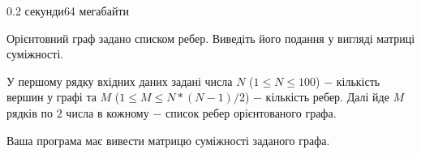 \begin{problem}{}{}{}{0.2 секунди}{64 мегабайти}

Орієнтовний граф задано списком ребер. Виведіть його подання у вигляді матриці суміжності.

\InputFile
У першому рядку вхідних даних задані числа $N$ ($1 \le N \le 100$) $-$ кількість вершин у графі та 
$M$ ($1 \le M \le N*(N-1)/2$) $-$ кількість ребер.
Далі йде $M$ рядків по $2$ числа в кожному $-$ список ребер орієнтованого графа. 

\OutputFile
Ваша програма має вивести матрицю суміжності заданого графа.

\Example

\begin{example}
%
\end{example}

\end{problem}


